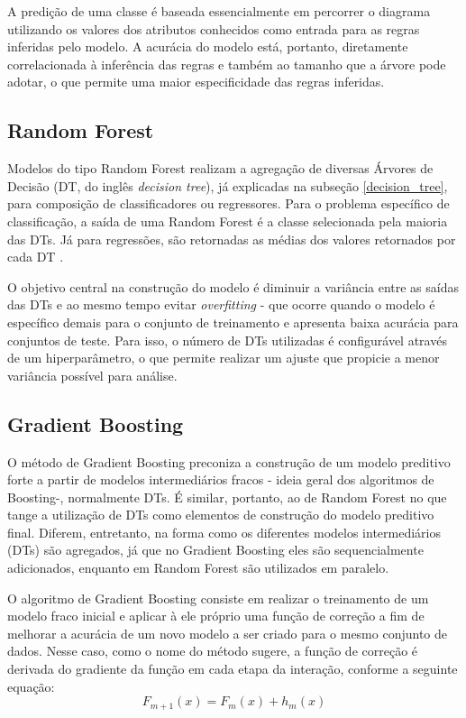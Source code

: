 \documentclass{homework}
\begin{document}
A predição de uma classe é baseada essencialmente em percorrer o diagrama utilizando os valores dos atributos conhecidos
como entrada para as regras inferidas pelo modelo. A acurácia do modelo está, portanto, diretamente correlacionada à
inferência das regras e também ao tamanho que a árvore pode adotar, o que permite uma maior especificidade das regras
inferidas.

\subsection{Random Forest}

Modelos do tipo Random Forest realizam a agregação de diversas Árvores de Decisão (DT, do inglês \textit{decision tree}),
já explicadas na subseção \ref{decision_tree}, para composição de classificadores ou regressores. Para o problema
específico de classificação, a saída de uma Random Forest é a classe selecionada pela maioria das DTs. Já para
regressões, são retornadas as médias dos valores retornados por cada DT \cite{random_forest}.

O objetivo central na construção do modelo é diminuir a variância entre as saídas das DTs e ao mesmo tempo evitar
\textit{overfitting} - que ocorre quando o modelo é específico demais para o conjunto de treinamento e apresenta baixa
acurácia para conjuntos de teste. Para isso, o número de DTs utilizadas é configurável através de um hiperparâmetro, o
que permite realizar um ajuste que propicie a menor variância possível para análise.

\subsection{Gradient Boosting}

O método de Gradient Boosting preconiza a construção de um modelo preditivo forte a partir de modelos intermediários
fracos - ideia geral dos algoritmos de Boosting-, normalmente DTs. É similar, portanto, ao de Random Forest no que tange
a utilização de DTs como elementos de construção do modelo preditivo final. Diferem, entretanto, na forma como os
diferentes modelos intermediários (DTs) são agregados, já que no Gradient Boosting eles são sequencialmente adicionados,
enquanto em Random Forest são utilizados em paralelo.

O algoritmo de Gradient Boosting consiste em realizar o treinamento de um modelo fraco inicial e aplicar à ele próprio
uma função de correção a fim de melhorar a acurácia de um novo modelo a ser criado para o mesmo conjunto de dados. Nesse
caso, como o nome do método sugere, a função de correção é derivada do gradiente da função em cada etapa da interação,
conforme a seguinte equação:
\begin{equation}
    F_{m+1}(x) = F_m(x) + h_m(x)
\end{equation}
\end{document}
